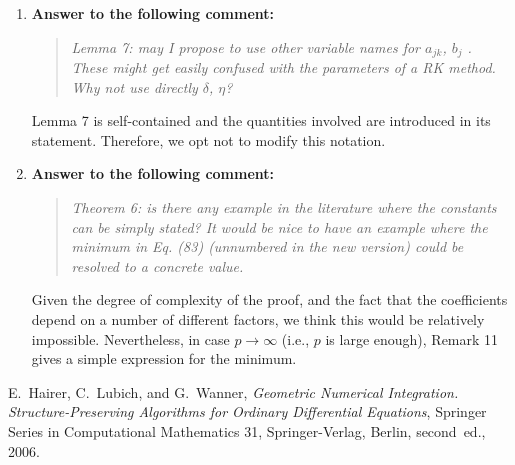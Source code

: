 \documentclass[10pt]{article}
\begin{document}
\begin{enumerate}
\item \textbf{Answer to the following comment:}
\begin{quote} \textit{Lemma 7: may I propose to use other variable names for $a_{jk}$, $b_j$ . These might get easily confused with the parameters of a RK method. Why not use directly $\delta$, $\eta$?} \end{quote}
Lemma 7 is self-contained and the quantities involved are introduced in its statement. Therefore, we opt not to modify this notation.

\item \textbf{Answer to the following comment:}
\begin{quote} \textit{Theorem 6: is there any example in the literature where the constants can be simply stated? It would be nice to have an example where the	minimum in Eq. (83) (unnumbered in the new version) could be resolved to a concrete value.} \end{quote}
Given the degree of complexity of the proof, and the fact that the coefficients depend on a number of different factors, we think this would be relatively impossible. Nevertheless, in case $p \to \infty$ (i.e., $p$ is large enough), Remark 11 gives a simple expression for the minimum.

\end{enumerate}

\def\cprime{$'$}
\begin{thebibliography}{10}
	
	{\sc E.~Hairer, C.~Lubich, and G.~Wanner}, {\em Geometric Numerical
		Integration. Structure-Preserving Algorithms for Ordinary Differential
		Equations}, Springer Series in Computational Mathematics 31, Springer-Verlag,
	Berlin, second~ed., 2006.
	
\end{thebibliography}
\end{document}
